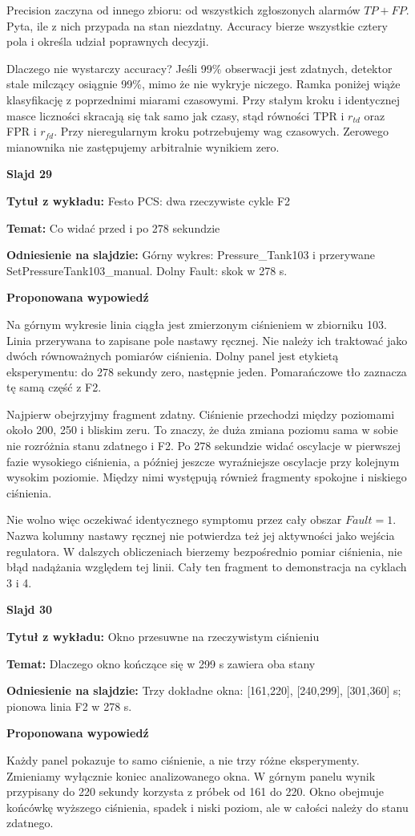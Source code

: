 \documentclass[a4paper,11pt]{article}
\newcommand{\NumerSlajdu}{1}
\newcommand{\Komentarz}[3]{%
  \gdef\NumerSlajdu{#1}%
  {\Large\bfseries Slajd #1\par}\smallskip
  \textbf{Tytuł z wykładu:} #2\par
  \textbf{Temat:} #3\par\medskip
}
\begin{document}
Precision zaczyna od innego zbioru: od wszystkich zgłoszonych alarmów $TP+FP$. Pyta, ile z nich przypada na stan niezdatny. Accuracy bierze wszystkie cztery pola i określa udział poprawnych decyzji.

Dlaczego nie wystarczy accuracy? Jeśli 99\% obserwacji jest zdatnych, detektor stale milczący osiągnie 99\%, mimo że nie wykryje niczego. Ramka poniżej wiąże klasyfikację z poprzednimi miarami czasowymi. Przy stałym kroku i identycznej masce liczności skracają się tak samo jak czasy, stąd równości TPR i $r_{td}$ oraz FPR i $r_{fd}$. Przy nieregularnym kroku potrzebujemy wag czasowych. Zerowego mianownika nie zastępujemy arbitralnie wynikiem zero.
\clearpage

\Komentarz{29}{Festo PCS: dwa rzeczywiste cykle F2}{Co widać przed i po 278 sekundzie}
{\small\color{black!65}\textbf{Odniesienie na slajdzie:} Górny wykres: Pressure\_Tank103 i przerywane SetPressureTank103\_manual. Dolny Fault: skok w 278 s.\par}
\medskip
\textbf{Proponowana wypowiedź}\par
Na górnym wykresie linia ciągła jest zmierzonym ciśnieniem w zbiorniku 103. Linia przerywana to zapisane pole nastawy ręcznej. Nie należy ich traktować jako dwóch równoważnych pomiarów ciśnienia. Dolny panel jest etykietą eksperymentu: do 278 sekundy zero, następnie jeden. Pomarańczowe tło zaznacza tę samą część z F2.

Najpierw obejrzyjmy fragment zdatny. Ciśnienie przechodzi między poziomami około 200, 250 i bliskim zeru. To znaczy, że duża zmiana poziomu sama w sobie nie rozróżnia stanu zdatnego i F2. Po 278 sekundzie widać oscylacje w pierwszej fazie wysokiego ciśnienia, a później jeszcze wyraźniejsze oscylacje przy kolejnym wysokim poziomie. Między nimi występują również fragmenty spokojne i niskiego ciśnienia.

Nie wolno więc oczekiwać identycznego symptomu przez cały obszar $Fault=1$. Nazwa kolumny nastawy ręcznej nie potwierdza też jej aktywności jako wejścia regulatora. W dalszych obliczeniach bierzemy bezpośrednio pomiar ciśnienia, nie błąd nadążania względem tej linii. Cały ten fragment to demonstracja na cyklach 3 i 4.
\clearpage

\Komentarz{30}{Okno przesuwne na rzeczywistym ciśnieniu}{Dlaczego okno kończące się w 299 s zawiera oba stany}
{\small\color{black!65}\textbf{Odniesienie na slajdzie:} Trzy dokładne okna: [161,220], [240,299], [301,360] s; pionowa linia F2 w 278 s.\par}
\medskip
\textbf{Proponowana wypowiedź}\par
Każdy panel pokazuje to samo ciśnienie, a nie trzy różne eksperymenty. Zmieniamy wyłącznie koniec analizowanego okna. W górnym panelu wynik przypisany do 220 sekundy korzysta z próbek od 161 do 220. Okno obejmuje końcówkę wyższego ciśnienia, spadek i niski poziom, ale w całości należy do stanu zdatnego.
\end{document}
